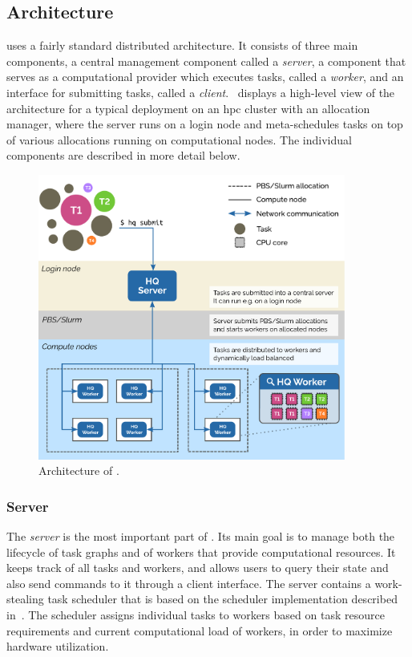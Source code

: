 \subsection{Architecture}
\hyperqueue{} uses a fairly standard distributed architecture. It consists of three main
components, a central management component called a \emph{server}, a component that serves
as a computational provider which executes tasks, called a \emph{worker}, and an interface
for submitting tasks, called a \emph{client}.~ displays a high-level
view of the \hyperqueue{} architecture for a typical deployment on an
\gls{hpc} cluster with an allocation manager, where the server runs on a login node
and meta-schedules tasks on top of various allocations running on computational nodes. The
individual components are described in more detail below.

\begin{figure}[h]
	\centering
	\includegraphics[width=0.9\textwidth]{imgs/hq/architecture}
	\caption{Architecture of \hyperqueue{}.}
	\label{fig:hq-architecture}
\end{figure}

\subsubsection*{Server}
The \emph{server} is the most important part of \hyperqueue{}. Its main goal is
to manage both the lifecycle of task graphs and of workers that provide computational resources. It
keeps track of all tasks and workers, and allows users to query their state and also send commands
to it through a client interface. The server contains a work-stealing task scheduler that is based
on the \rsds{} scheduler implementation described in~. The
scheduler assigns individual tasks to workers based on task resource requirements and current
computational load of workers, in order to maximize hardware utilization.

